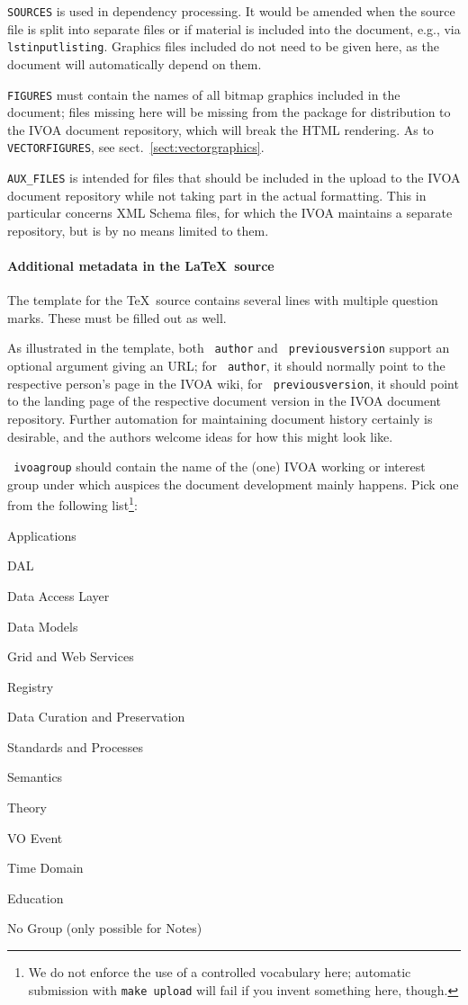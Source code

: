 \documentclass[11pt,a4paper]{ivoa}
\newcommand{\texword}[1]{\texttt{\color{texcolor} #1}}
\begin{document}
\texttt{SOURCES} is used in dependency processing.  It would be amended
when the source file is split into separate files or if material is
included into the document, e.g., via \texword{lstinputlisting}.
Graphics files included do not need to be given here, as the document
will automatically depend on them.

\texttt{FIGURES} must contain the names of all bitmap graphics included
in the document; files missing here will be missing from the package for
distribution to the IVOA document repository, which will break the HTML
rendering.  As to \texttt{VECTORFIGURES}, see
sect.~\ref{sect:vectorgraphics}.

\texttt{AUX\_FILES} is intended for files that should be included in the
upload to the IVOA document repository while not taking part in the
actual formatting.  This in particular concerns XML Schema files, for
which the IVOA maintains a separate repository, but is by no means
limited to them.

\paragraph{Additional metadata in the \LaTeX~source}

The template for the \TeX\ source contains several lines with
multiple question marks.  These must be filled out as well.

As illustrated in the template, both \texword{author} and
\texword{previousversion} support an optional argument giving an URL; for
\texword{author}, it should normally point to the respective person's
page in the IVOA wiki, for \texword{previousversion}, it should point to
the landing page of the respective document version in the IVOA document
repository.  Further automation for maintaining document history
certainly is desirable, and the authors welcome ideas for how this might
look like.

\texword{ivoagroup} should contain the name of the (one) IVOA working or
interest group under which auspices the document development mainly
happens.  Pick one from the following list\footnote{We do not
enforce the use of a controlled vocabulary here; automatic submission
with \texttt{make upload} will fail if you invent something here,
though.}:

\begin{compactitem}
\item Applications
\item DAL
\item Data Access Layer
\item Data Models
\item Grid and Web Services
\item Registry
\item Data Curation and Preservation
\item Standards and Processes
\item Semantics
\item Theory
\item VO Event
\item Time Domain
\item Education
\item No Group (only possible for Notes)
\end{compactitem}
\end{document}
